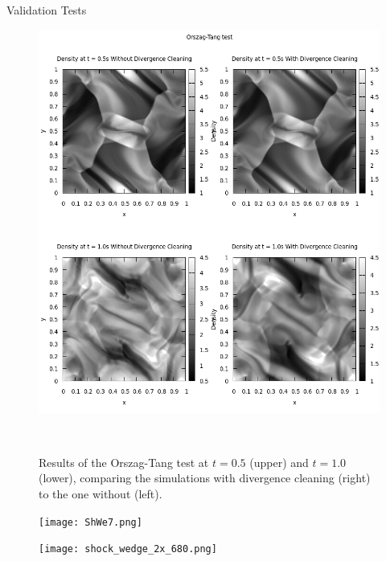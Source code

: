 \documentclass[final]{beamer}
\begin{document}
\begin{frame}{}
\begin{textblock}{19.0}
\begin{block}{Validation Tests}
\begin{minipage}{0.90\linewidth}
		\begin{figure}
			\begin{minipage}{1.0\linewidth}
				\includegraphics[width = \linewidth]{OrszagTang.png}
			\end{minipage}\\
			\vspace{0.2cm}
			\begin{minipage}{1.0\linewidth}
				\caption{Results of the Orszag-Tang test at $t=0.5$ (upper) and $t=1.0$ (lower), comparing the simulations with divergence cleaning (right) to the one without (left).}
				\label{fig:Orszag-Tang}
			\end{minipage}
		\end{figure}
		\vspace{0.6cm} 
		
		\begin{figure}
			\centering
			
			\begin{minipage}{0.60\textwidth}
				\texttt{[image: ShWe7.png]}
			\end{minipage}
			\hspace{-3cm}
			\begin{minipage}{0.40\textwidth}
				\texttt{[image: shock\_wedge\_2x\_680.png]}
			\end{minipage}
			\vspace{0.2cm}
			

\end{figure}
\end{minipage}
\end{block}
\end{textblock}
\end{frame}
\end{document}
